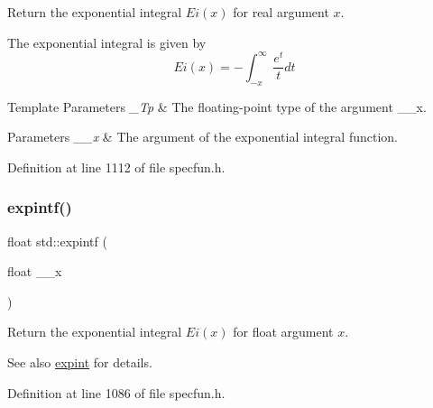 Return the exponential integral $ Ei(x) $ for {\ttfamily real} argument $ x $.

The exponential integral is given by \[ Ei(x) = -\int_{-x}^\infty \frac{e^t}{t} dt \]


\begin{DoxyTemplParams}{Template Parameters}
{\em \+\_\+\+Tp} & The floating-\/point type of the argument {\ttfamily \+\_\+\+\_\+x}. \\
\hline
\end{DoxyTemplParams}

\begin{DoxyParams}{Parameters}
{\em \+\_\+\+\_\+x} & The argument of the exponential integral function. \\
\hline
\end{DoxyParams}


Definition at line 1112 of file specfun.\+h.

\mbox{\label{group__cxx17__math__spec__func_ga5842816f6eed2594e0a327df4e4a2a47}} 
\subsubsection{\texorpdfstring{expintf()}{expintf()}}
{\footnotesize\ttfamily float std\+::expintf (\begin{DoxyParamCaption}\item[{float}]{\+\_\+\+\_\+x }\end{DoxyParamCaption})\hspace{0.3cm}{\ttfamily [inline]}}

Return the exponential integral $ Ei(x) $ for {\ttfamily float} argument $ x $.

\begin{DoxySeeAlso}{See also}
\hyperlink{group__cxx17__math__spec__func_ga0e9ac717a106ef54184b5f058c451782}{expint} for details. 
\end{DoxySeeAlso}


Definition at line 1086 of file specfun.\+h.

\mbox{\label{group__cxx17__math__spec__func_ga1329130b32328d0666e290ee5931fa4f}} 
